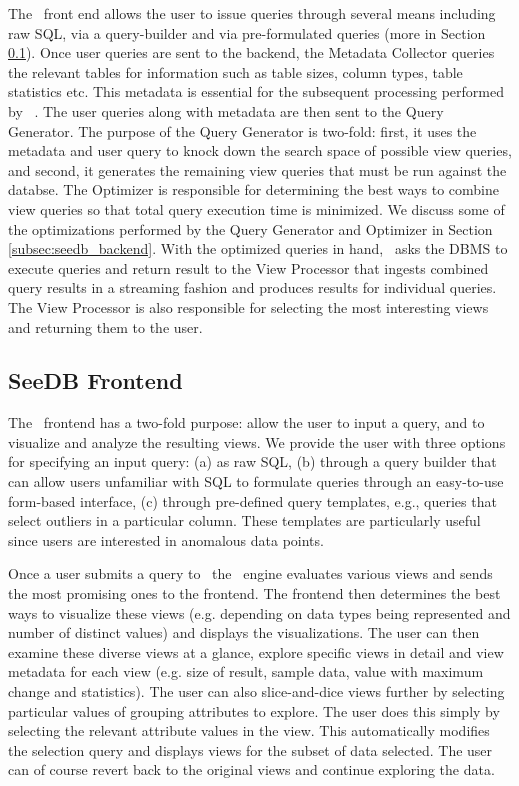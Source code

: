 The \SeeDB\ front end allows the user to issue queries
through several means including raw SQL, via a query-builder and via
pre-formulated queries (more in Section \ref{subsec:seedb_frontend}). Once user
queries are sent to the backend, the Metadata Collector queries the relevant
tables for information such as table sizes, column types, table statistics etc.
This metadata is essential for the subsequent processing performed by \SeeDB\ .
The user queries along with metadata are then sent to the Query Generator.
The purpose of the Query Generator is two-fold: first, it uses the metadata and
user query to knock down the search space of possible view queries, and second,
it generates the remaining view queries that must be run against the databse.
The Optimizer is responsible for determining the best ways to combine view
queries so that total query execution time is minimized. We discuss some of the
optimizations performed by the Query Generator and Optimizer in Section
\ref{subsec:seedb_backend}. With the optimized queries in hand, \SeeDB\ asks the
DBMS to execute queries and return result to the View Processor that ingests
combined query results in a streaming fashion and produces results for
individual queries. The View Processor is also responsible for selecting the
most interesting views and returning them to the user.

\subsection{SeeDB Frontend}
\label{subsec:seedb_frontend}

The \SeeDB\ frontend has a two-fold purpose: allow the user to input a query, and 
to visualize
and analyze the resulting views. We provide the user with three options for
specifying an input query: (a) as raw SQL, (b) through a query builder that can
allow users unfamiliar with SQL to formulate queries through an easy-to-use
form-based interface, (c) through pre-defined query templates, e.g., queries
that select outliers in a particular column. These templates are particularly
useful since users are interested in anomalous data points.

Once a user submits a query to \SeeDB\, the \SeeDB\ engine evaluates various
views and sends the most promising ones to the frontend. The frontend then
determines the best ways to visualize these views (e.g. depending on data types
being represented and number of distinct values) and displays the
visualizations. The user can then examine these diverse views at a glance,
explore specific views in detail and view metadata for each view (e.g. size of
result, sample data, value with maximum change and statistics). The user can
also slice-and-dice views further by selecting particular values of grouping
attributes to explore. The user does this simply by selecting the relevant
attribute values in the view. This automatically modifies the selection query
and displays views for the subset of data selected. The user can of course
revert back to the original views and continue exploring the data.

